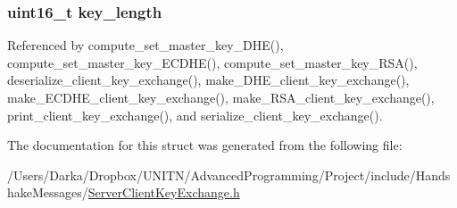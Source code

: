 \subsubsection[{\texorpdfstring{key\+\_\+length}{key_length}}]{\setlength{\rightskip}{0pt plus 5cm}uint16\+\_\+t key\+\_\+length}\hypertarget{structclient__key__exchange__t_aaca3c65525352f552124c3d947b60dcb}{}\label{structclient__key__exchange__t_aaca3c65525352f552124c3d947b60dcb}


Referenced by compute\+\_\+set\+\_\+master\+\_\+key\+\_\+\+D\+H\+E(), compute\+\_\+set\+\_\+master\+\_\+key\+\_\+\+E\+C\+D\+H\+E(), compute\+\_\+set\+\_\+master\+\_\+key\+\_\+\+R\+S\+A(), deserialize\+\_\+client\+\_\+key\+\_\+exchange(), make\+\_\+\+D\+H\+E\+\_\+client\+\_\+key\+\_\+exchange(), make\+\_\+\+E\+C\+D\+H\+E\+\_\+client\+\_\+key\+\_\+exchange(), make\+\_\+\+R\+S\+A\+\_\+client\+\_\+key\+\_\+exchange(), print\+\_\+client\+\_\+key\+\_\+exchange(), and serialize\+\_\+client\+\_\+key\+\_\+exchange().



The documentation for this struct was generated from the following file\+:\begin{DoxyCompactItemize}
\item 
/\+Users/\+Darka/\+Dropbox/\+U\+N\+I\+T\+N/\+Advanced\+Programming/\+Project/include/\+Handshake\+Messages/\hyperlink{_server_client_key_exchange_8h}{Server\+Client\+Key\+Exchange.\+h}\end{DoxyCompactItemize}
